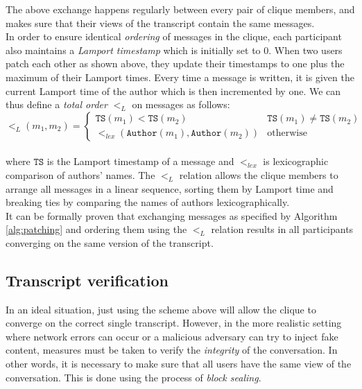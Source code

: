 \documentclass[a4paper, 12pt]{report}
\begin{document}
The above exchange happens regularly between every pair of clique members, and makes sure that their views of the transcript contain the same messages. \\

In order to ensure identical \emph{ordering} of messages in the clique, each participant also maintains a \emph{Lamport timestamp} which is initially set to 0. When two users patch each other as shown above, they update their timestamps to one plus the maximum of their Lamport times. Every time a message is written, it is given the current Lamport time of the author which is then incremented by one. We can thus define a \emph{total order} $<_L$ on messages as follows:\\

\[
    <_L(m_1, m_2) = 
        \begin{cases}
            \mathtt{TS}(m_1) < \mathtt{TS}(m_2) & \mathtt{TS}(m_1) \neq \mathtt{TS}(m_2) \\
            <_{lex}(\mathtt{Author}(m_1), \mathtt{Author}(m_2)) & \text{otherwise}
        \end{cases}
\] \\

where $\mathtt{TS}$ is the Lamport timestamp of a message and $<_{lex}$ is lexicographic comparison of authors' names. The $<_L$ relation allows the clique members to arrange all messages in a linear sequence, sorting them by Lamport time and breaking ties by comparing the names of authors lexicographically. \\ 

It can be formally proven \cite{reardon2007kleeq} that exchanging messages as specified by Algorithm \ref{alg:patching} and ordering them using the $<_L$ relation results in all participants converging on the same version of the transcript.


\subsection{Transcript verification}
\label{subsec:prep.sealing}
In an ideal situation, just using the scheme above will allow the clique to converge on the correct single transcript. However, in the more realistic setting where network errors can occur or a malicious adversary can try to inject fake content, measures must be taken to verify the \emph{integrity} of the conversation. In other words, it is necessary to make sure that all users have the same view of the conversation. This is done using the process of \emph{block sealing}. \\
\end{document}
